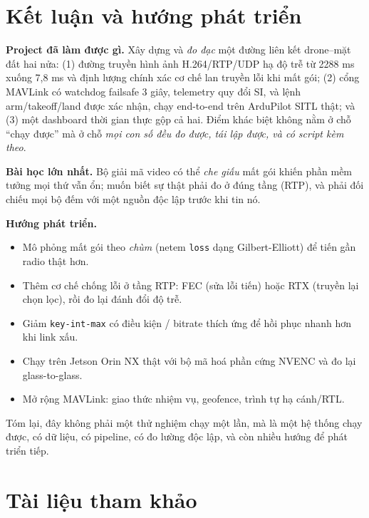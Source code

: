 \documentclass[12pt]{ai_conquer2026}
\begin{document}
\section{Kết luận và hướng phát triển}

\textbf{Project đã làm được gì.} Xây dựng và \emph{đo đạc} một đường liên kết
drone--mặt đất hai nửa: (1) đường truyền hình ảnh H.264/RTP/UDP hạ độ trễ từ
2288 ms xuống 7,8 ms và định lượng chính xác cơ chế lan truyền lỗi khi mất gói;
(2) cổng MAVLink có watchdog failsafe 3 giây, telemetry quy đổi SI, và lệnh
arm/takeoff/land được xác nhận, chạy end-to-end trên ArduPilot SITL thật; và (3)
một dashboard thời gian thực gộp cả hai. Điểm khác biệt không nằm ở chỗ ``chạy
được'' mà ở chỗ \emph{mọi con số đều đo được, tái lập được, và có script kèm
theo}.

\textbf{Bài học lớn nhất.} Bộ giải mã video có thể \emph{che giấu} mất gói khiến
phần mềm tưởng mọi thứ vẫn ổn; muốn biết sự thật phải đo ở đúng tầng (RTP), và
phải đối chiếu mọi bộ đếm với một nguồn độc lập trước khi tin nó.

\textbf{Hướng phát triển.}

\begin{itemize}
\item Mô phỏng mất gói theo \emph{chùm} (netem \texttt{loss} dạng Gilbert-Elliott)
      để tiến gần radio thật hơn.
\item Thêm cơ chế chống lỗi ở tầng RTP: FEC (sửa lỗi tiến) hoặc RTX (truyền lại
      chọn lọc), rồi đo lại đánh đổi độ trễ.
\item Giảm \texttt{key-int-max} có điều kiện / bitrate thích ứng để hồi phục
      nhanh hơn khi link xấu.
\item Chạy trên Jetson Orin NX thật với bộ mã hoá phần cứng NVENC và đo lại
      glass-to-glass.
\item Mở rộng MAVLink: giao thức nhiệm vụ, geofence, trình tự hạ cánh/RTL.
\end{itemize}

Tóm lại, đây không phải một thử nghiệm chạy một lần, mà là một hệ thống chạy
được, có dữ liệu, có pipeline, có đo lường độc lập, và còn nhiều hướng để phát
triển tiếp.

\newpage
\section{Tài liệu tham khảo}
\label{section:references}
\nocite{*}
\vspace{-3.2em}
\printbibliography
\end{document}
